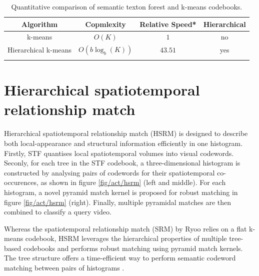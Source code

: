 \begin{table}
	\begin{center}
		\begin{tabular}{|c|c|c|c|}
			\hline
			\textbf{ Algorithm} & \textbf{ Copmlexity} & \textbf{ Relative Speed}* & \textbf{ Hierarchical} \\
			\hline
			k-means & $O(K)$ & $1$ & no \\
			Hierarchical k-means & $O(b\log_{b}(K))$ & $43.51$ & yes \\
			{\color{blue}{STF}} & {\color{blue}{ $ O(\log_{2}(K)) $ }} & {\color{blue}{$559.86$}} & {\color{blue}{yes}}\\
			\hline
		\end{tabular}
	\end{center}
	\caption{Quantitative comparison of semantic texton forest and k-means codebooks.}
	\label{tab/act/codebook}
\end{table}

\section{Hierarchical spatiotemporal relationship match}
\label{sec/act/HSRM}

Hierarchical spatiotemporal relationship match (HSRM) is designed to describe both local-appearance and structural information efficiently in one histogram. 
Firstly, STF quantises local spatiotemporal volumes into visual codewords. 
Seconly, for each tree in the STF codebook, a three-dimensional histogram is constructed by analysing pairs of codewords for their spatiotemporal co-occurences, as shown in figure \ref{fig/act/hsrm} (left and middle). 
For each histogram, a novel pyramid match kernel is proposed for robust matching in figure \ref{fig/act/hsrm} (right). 
Finally, multiple pyramidal matches are then combined to classify a query video. 

Whereas the spatiotemporal relationship match (SRM) by Ryoo \etal \cite{Ryoo2009} relies on a flat k-means codebook, HSRM leverages the hierarchical properties of multiple tree-based codebooks and performs robust matching using pyramid match kernels. The tree structure offers a time-efficient way to perform semantic codeword matching between pairs of histograms \cite{Grauman2005}.

